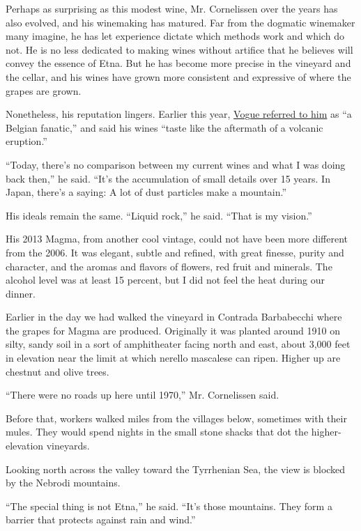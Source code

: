 Perhaps as surprising as this modest wine, Mr. Cornelissen over the
years has also evolved, and his winemaking has matured. Far from the
dogmatic winemaker many imagine, he has let experience dictate which
methods work and which do not. He is no less dedicated to making wines
without artifice that he believes will convey the essence of Etna. But
he has become more precise in the vineyard and the cellar, and his wines
have grown more consistent and expressive of where the grapes are grown.

Nonetheless, his reputation lingers. Earlier this year,
\href{http://www.vogue.com/13427836/natural-wine-industry-chemical-free/}{Vogue
referred to him} as ``a Belgian fanatic,'' and said his wines ``taste
like the aftermath of a volcanic eruption.''

``Today, there's no comparison between my current wines and what I was
doing back then,'' he said. ``It's the accumulation of small details
over 15 years. In Japan, there's a saying: A lot of dust particles make
a mountain.''

His ideals remain the same. ``Liquid rock,'' he said. ``That is my
vision.''

His 2013 Magma, from another cool vintage, could not have been more
different from the 2006. It was elegant, subtle and refined, with great
finesse, purity and character, and the aromas and flavors of flowers,
red fruit and minerals. The alcohol level was at least 15 percent, but I
did not feel the heat during our dinner.

Earlier in the day we had walked the vineyard in Contrada Barbabecchi
where the grapes for Magma are produced. Originally it was planted
around 1910 on silty, sandy soil in a sort of amphitheater facing north
and east, about 3,000 feet in elevation near the limit at which nerello
mascalese can ripen. Higher up are chestnut and olive trees.

``There were no roads up here until 1970,'' Mr. Cornelissen said.

Before that, workers walked miles from the villages below, sometimes
with their mules. They would spend nights in the small stone shacks that
dot the higher-elevation vineyards.

Looking north across the valley toward the Tyrrhenian Sea, the view is
blocked by the Nebrodi mountains.

``The special thing is not Etna,'' he said. ``It's those mountains. They
form a barrier that protects against rain and wind.''

